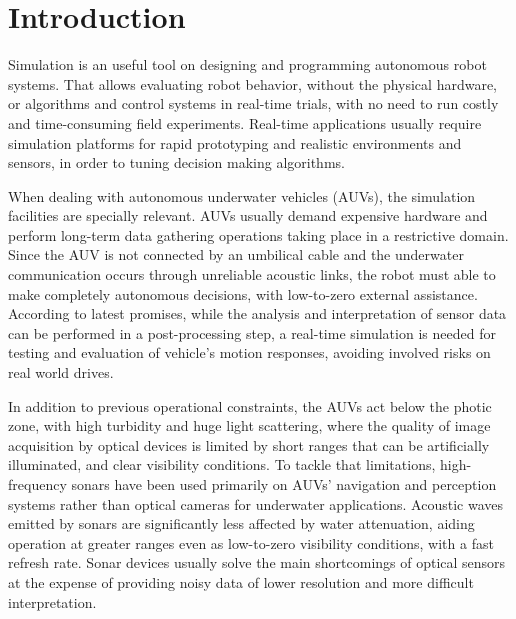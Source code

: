 \documentclass[final,5p,times]{elsarticle}
\begin{document}
\linenumbers

\section{Introduction}
\label{introduction}

Simulation is an useful tool on designing and programming autonomous robot systems. That allows evaluating robot behavior, without the physical hardware, or algorithms and control systems in real-time trials, with no need to run costly and time-consuming field experiments. Real-time applications usually require simulation platforms for rapid prototyping and realistic environments and sensors, in order to tuning decision making algorithms.

When dealing with autonomous underwater vehicles (AUVs), the 
simulation facilities are specially relevant. AUVs usually demand expensive 
hardware and perform long-term data gathering operations taking place 
in a restrictive domain. Since the AUV is not connected by an umbilical 
cable and the underwater communication occurs through unreliable 
acoustic links, the robot must able to make completely autonomous 
decisions, with low-to-zero external assistance. According to latest promises, while the analysis and interpretation of sensor data can be performed 
in a post-processing step, a real-time simulation is needed for testing 
and evaluation of vehicle's motion responses, avoiding involved risks 
on real world drives.

In addition to previous operational constraints, the AUVs act below the photic zone, with high turbidity and huge light scattering, where the quality of image acquisition by optical devices is limited by short ranges that can be artificially illuminated, and clear visibility conditions. To tackle that limitations, high-frequency sonars have been used primarily on AUVs' navigation and perception systems rather than optical cameras for underwater applications. Acoustic waves emitted by sonars are significantly less affected by water attenuation, aiding operation at greater ranges even as low-to-zero visibility conditions, with a fast refresh rate. Sonar devices usually solve the main shortcomings of optical sensors at the expense of providing noisy data of lower resolution and more difficult interpretation.
\end{document}
